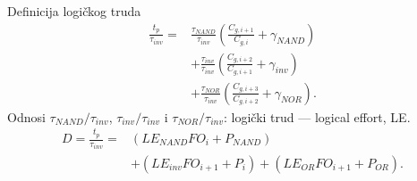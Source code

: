 \begin{frame}[label=09_3-s043]{Definicija logičkog truda}
\[\begin{aligned}
\frac{t_p}{\tau_{inv}}={}&\frac{\tau_{NAND}}{\tau_{inv}}
 \left(\frac{C_{g,i+1}}{C_{g,i}}+\gamma_{NAND}\right)\\
&+\frac{\tau_{inv}}{\tau_{inv}}\left(\frac{C_{g,i+2}}{C_{g,i+1}}+\gamma_{inv}\right)\\
&+\frac{\tau_{NOR}}{\tau_{inv}}\left(\frac{C_{g,i+3}}{C_{g,i+2}}+\gamma_{NOR}\right).
\end{aligned}\]
Odnosi $\tau_{NAND}/\tau_{inv}$, $\tau_{inv}/\tau_{inv}$ i $\tau_{NOR}/\tau_{inv}$:
\alert{logički trud — logical effort, LE}.
\[\begin{aligned}
D=\frac{t_p}{\tau_{inv}}={}&(LE_{NAND}FO_i+P_{NAND})\\
&+(LE_{inv}FO_{i+1}+P_i)+(LE_{OR}FO_{i+1}+P_{OR}).
\end{aligned}\]
\end{frame}
